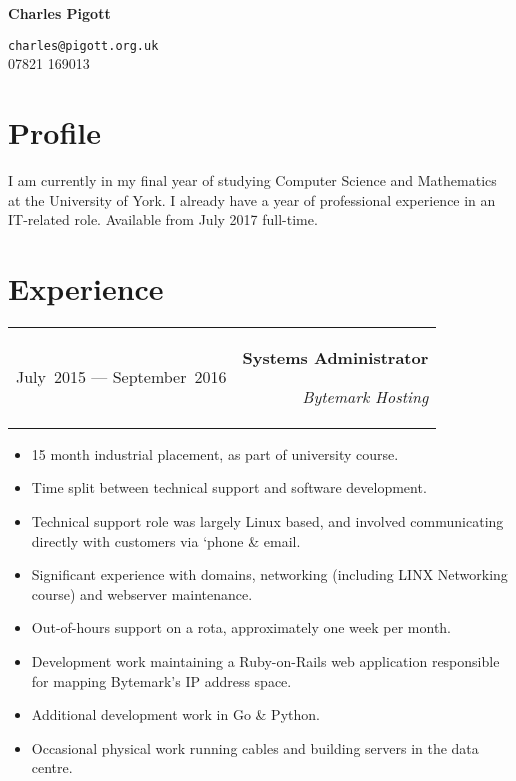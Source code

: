 \documentclass[11pt,a4paper]{article}
\makeatletter
\def\myemail{charles@pigott.org.uk}
\def\myphone{07821 169013}
\newenvironment{myitemize}
{\begin{itemize}[leftmargin=.75in,rightmargin=.75in]
  \itemsep1pt \parskip0pt \parsep0pt}
{\end{itemize}}
\makeatother
\begin{document}

\noindent\begin{minipage}{0.4\textwidth}
\textbf{\Huge{Charles Pigott}}
\end{minipage}
\hfill
\begin{minipage}{0.4\textwidth}
\begin{flushright}
  \texttt{\myemail}\\
  \myphone\\
\end{flushright}
\end{minipage}

\par

\section{Profile}
I am currently in my final year of studying Computer Science and Mathematics at
the University of York. I already have a year of professional experience in an
IT-related role. Available from July 2017 full-time.

\section{Experience}
\noindent\begin{tabularx}{\textwidth}{@{}L R@{}}
  July~2015 --- September~2016 &
  \textbf{Systems Administrator} \par
  \textit{Bytemark Hosting}
\end{tabularx}
\begin{myitemize}
  \item 15 month industrial placement, as part of university course.
  \item Time split between technical support and software development.
  \item Technical support role was largely Linux based, and involved
    communicating directly with customers via `phone \& email.
  \item Significant experience with domains, networking (including LINX
    Networking course) and webserver maintenance.
  \item Out-of-hours support on a rota, approximately one week per month.
  \item Development work maintaining a Ruby-on-Rails web application responsible
    for mapping Bytemark's IP address space.
  \item Additional development work in Go \& Python.
  \item Occasional physical work running cables and building servers in the
    data centre.
\end{myitemize}
\end{document}
